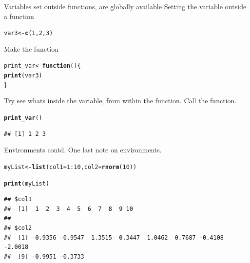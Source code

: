 \documentclass{beamer}\usepackage[]{graphicx}\usepackage[]{color}
\makeatletter
\newcommand{\hlnum}[1]{\textcolor[rgb]{0.686,0.059,0.569}{#1}}%
\newcommand{\hlopt}[1]{\textcolor[rgb]{0,0,0}{#1}}%
\newcommand{\hlstd}[1]{\textcolor[rgb]{0.345,0.345,0.345}{#1}}%
\newcommand{\hlkwa}[1]{\textcolor[rgb]{0.161,0.373,0.58}{\textbf{#1}}}%
\newcommand{\hlkwb}[1]{\textcolor[rgb]{0.69,0.353,0.396}{#1}}%
\newcommand{\hlkwc}[1]{\textcolor[rgb]{0.333,0.667,0.333}{#1}}%
\newcommand{\hlkwd}[1]{\textcolor[rgb]{0.737,0.353,0.396}{\textbf{#1}}}%
\newenvironment{kframe}{%
 \def\at@end@of@kframe{}%
 \ifinner\ifhmode%
  \def\at@end@of@kframe{\end{minipage}}%
  \begin{minipage}{\columnwidth}%
 \fi\fi%
 \def\FrameCommand##1{\hskip\@totalleftmargin \hskip-\fboxsep
 \colorbox{shadecolor}{##1}\hskip-\fboxsep
     \hskip-\linewidth \hskip-\@totalleftmargin \hskip\columnwidth}%
 \MakeFramed {\advance\hsize-\width
   \@totalleftmargin\z@ \linewidth\hsize
   \@setminipage}}%
 {\par\unskip\endMakeFramed%
 \at@end@of@kframe}
\newenvironment{knitrout}{}{} %
\makeatother
\begin{document}
\begin{frame}[fragile]{Variables set outside functions, are globally available}
Setting the variable outside a function
\begin{knitrout}
\color{fgcolor}\begin{kframe}
\begin{alltt}
\hlstd{var3} \hlkwb{<-} \hlkwd{c}\hlstd{(}\hlnum{1}\hlstd{,} \hlnum{2}\hlstd{,} \hlnum{3}\hlstd{)}
\end{alltt}
\end{kframe}
\end{knitrout}

Make the function
\begin{knitrout}
\color{fgcolor}\begin{kframe}
\begin{alltt}
\hlstd{print_var} \hlkwb{<-} \hlkwa{function}\hlstd{() \{}
    \hlkwd{print}\hlstd{(var3)}
\hlstd{\}}
\end{alltt}
\end{kframe}
\end{knitrout}

Try see whats inside the variable, from within the function.
\linebreak
Call the function.
\begin{knitrout}
\color{fgcolor}\begin{kframe}
\begin{alltt}
\hlkwd{print_var}\hlstd{()}
\end{alltt}
\begin{verbatim}
## [1] 1 2 3
\end{verbatim}
\end{kframe}
\end{knitrout}

\end{frame}


\begin{frame}[fragile]{Environments contd.}
One last note on environments.
\begin{knitrout}
\color{fgcolor}\begin{kframe}
\begin{alltt}
\hlstd{myList} \hlkwb{<-} \hlkwd{list}\hlstd{(}\hlkwc{col1} \hlstd{=} \hlnum{1}\hlopt{:}\hlnum{10}\hlstd{,} \hlkwc{col2} \hlstd{=} \hlkwd{rnorm}\hlstd{(}\hlnum{10}\hlstd{))}

\hlkwd{print}\hlstd{(myList)}
\end{alltt}
\begin{verbatim}
## $col1
##  [1]  1  2  3  4  5  6  7  8  9 10
## 
## $col2
##  [1] -0.9356 -0.9547  1.3515  0.3447  1.0462  0.7687 -0.4108 -2.0018
##  [9] -0.9951 -0.3733
\end{verbatim}
\end{kframe}
\end{knitrout}


\end{frame}
\end{document}
